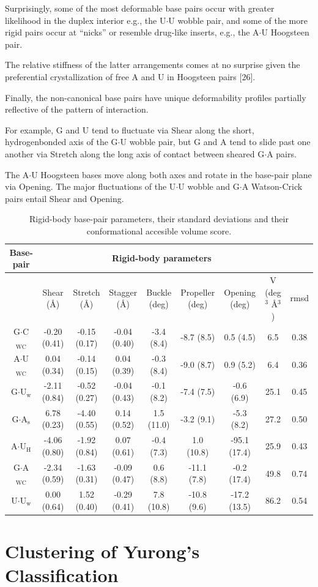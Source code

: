 Surprisingly,  some of the  most deformable base pairs  occur with
greater likelihood  in the duplex interior e.g.,  the U$\cdot$U wobble
pair, and some of the more  rigid pairs occur at ``nicks'' or resemble
drug-like inserts,  e.g., the  A$\cdot$U Hoogsteen pair.

The relative
stiffness of  the latter arrangements  comes at no surprise  given the
preferential crystallization of free A  and U in Hoogsteen pairs [26].

Finally,  the  non-canonical  base  pairs  have  unique  deformability
profiles  partially  reflective of  the  pattern  of interaction.

For
example,  G  and  U tend  to  fluctuate  via  Shear along  the  short,
hydrogenbonded axis of the G$\cdot$U wobble  pair, but G and A tend to
slide  past one another  via Stretch  along the  long axis  of contact
between sheared  G$\cdot$A pairs.

The A$\cdot$U Hoogsteen  bases move
along both  axes and  rotate in the  base-pair plane via  Opening. The
major fluctuations of the  U$\cdot$U wobble and G$\cdot$A Watson-Crick
pairs entail Shear and Opening.

\begin{table}
\begin{center}
\begin{tabular}{|c|c|c|c|c|c|c|c|c|}
\hline
Base-pair & \multicolumn{7}{c|}{Rigid-body parameters} \\
\hline
 & Shear (\AA) & Stretch (\AA) & Stagger (\AA) & Buckle (deg) &
Propeller (deg) & Opening (deg) & V (deg$^{\text{3}}$
\AA$^{\text{3}}$) & rmsd \\
\hline
G$\cdot$C$_{\text{WC}}$ & -0.20 (0.41) & -0.15 (0.17) & -0.04 (0.40) & -3.4 (8.4)  &  -8.7  (8.5) &  0.5  (4.5)  & 6.5   & 0.38\\
A$\cdot$U$_{\text{WC}}$ &  0.04 (0.34) & -0.14 (0.15) &  0.04 (0.39) & -0.3 (8.4)  &  -9.0  (8.7) &  0.9  (5.2)  & 6.4   & 0.36\\
G$\cdot$U$_{\text{w}}$  & -2.11 (0.84) & -0.52 (0.27) & -0.04 (0.43) & -0.1 (8.2)  &  -7.4  (7.5) & -0.6  (6.9)  & 25.1  & 0.45\\
G$\cdot$A$_{\text{s}}$  &  6.78 (0.23) & -4.40 (0.55) &  0.14 (0.52) &  1.5 (11.0) &  -3.2  (9.1) & -5.3  (8.2)  & 27.2  & 0.50\\
A$\cdot$U$_{\text{H}}$  & -4.06 (0.80) & -1.92 (0.84) &  0.07 (0.61) & -0.4 (7.3)  &   1.0 (10.8) & -95.1 (17.4) & 25.9  & 0.43\\
G$\cdot$A$_{\text{WC}}$ & -2.34 (0.59) & -1.63 (0.31) & -0.09 (0.47) &  0.6 (8.8)  & -11.1  (7.8) & -0.2  (17.4) & 49.8  & 0.74\\
U$\cdot$U$_{\text{w}}$  &  0.00 (0.64) &  1.52 (0.40) & -0.29 (0.41) &  7.8 (10.8) & -10.8  (9.6) & -17.2 (13.5) & 86.2  & 0.54\\
\hline
\end{tabular}
\caption{Rigid-body base-pair parameters, their standard deviations
  and their conformational accesible volume score.}
\label{tab:bppar}
\end{center}
\end{table}




\section{Clustering of Yurong's Classification}



